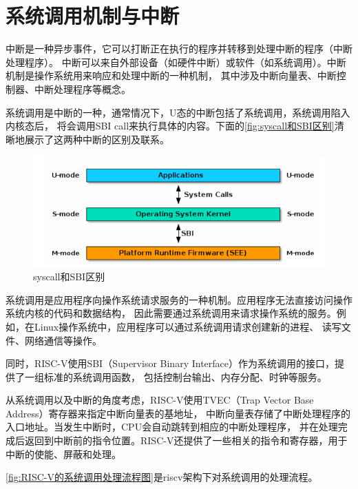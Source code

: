 \section{系统调用机制与中断}

中断是一种异步事件，它可以打断正在执行的程序并转移到处理中断的程序（中断处理程序）。
中断可以来自外部设备（如硬件中断）或软件（如系统调用）。中断机制是操作系统用来响应和处理中断的一种机制，
其中涉及中断向量表、中断控制器、中断处理程序等概念。

系统调用是中断的一种，通常情况下，U态的中断包括了系统调用，系统调用陷入内核态后，
将会调用SBI call来执行具体的内容。下面的\autoref{fig:syscall和SBI区别}清晰地展示了这两种中断的区别及联系。

\begin{figure}[htb]
    \centering
    \includegraphics[width=\textwidth]{figures/03-03-syscall和SBI区别.png}
    \caption{
        syscall和SBI区别
    }
    \label{fig:syscall和SBI区别}
\end{figure}

系统调用是应用程序向操作系统请求服务的一种机制。应用程序无法直接访问操作系统内核的代码和数据结构，
因此需要通过系统调用来请求操作系统的服务。例如，在Linux操作系统中，应用程序可以通过系统调用请求创建新的进程、
读写文件、网络通信等操作。

同时，RISC-V使用SBI（Supervisor Binary Interface）作为系统调用的接口，提供了一组标准的系统调用函数，
包括控制台输出、内存分配、时钟等服务。

从系统调用以及中断的角度考虑，RISC-V使用TVEC（Trap Vector Base Address）寄存器来指定中断向量表的基地址，
中断向量表存储了中断处理程序的入口地址。当发生中断时，CPU会自动跳转到相应的中断处理程序，
并在处理完成后返回到中断前的指令位置。RISC-V还提供了一些相关的指令和寄存器，用于中断的使能、屏蔽和处理。

\autoref{fig:RISC-V的系统调用处理流程图}是riscv架构下对系统调用的处理流程。

